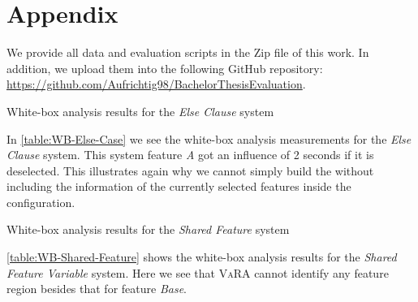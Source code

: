 \chapter{Appendix}\label{ch:appendix}

We provide all data and evaluation scripts in the Zip file of this work. In addition, we upload them into the following GitHub
repository: \url{https://github.com/Aufrichtig98/BachelorThesisEvaluation}.

\begin{table}[H]
    \centering
    
    \caption{White-box analysis results for the \emph{Else Clause} system}\label{table:WB-Else-Case}
 \end{table}

 In \autoref{table:WB-Else-Case} we see the white-box analysis measurements for the \emph{Else Clause} system.
 This system feature \emph{A} got an influence of 2 seconds if it is deselected.
 This illustrates again why we cannot simply build the {\perfInfluenceModel} without including the information of the currently selected features
 inside the configuration. 

 \begin{table}[H]
    \centering
    
    \caption{White-box analysis results for the \emph{Shared Feature} system}\label{table:WB-Shared-Feature}
 \end{table}

 \autoref{table:WB-Shared-Feature} shows the white-box analysis results for the \emph{Shared Feature Variable} system.
 Here we see that \textsc{VaRA} cannot identify any feature region besides that for feature \emph{Base}.


